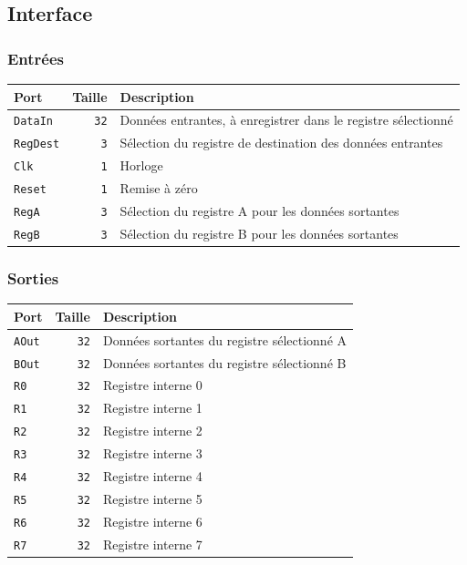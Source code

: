 \subsection{Interface}

\subsubsection{Entrées}

\begin{tabular}{|l|r|l|}
\hline
\textbf{Port}		& \textbf{Taille} & \textbf{Description}\\
\hline

\texttt{DataIn}		& \texttt{32} & Données entrantes, à enregistrer dans le registre sélectionné\\
\hline
\texttt{RegDest}	&  \texttt{3} & Sélection du registre de destination des données entrantes\\
\hline
\texttt{Clk}		&  \texttt{1} & Horloge\\
\hline
\texttt{Reset}		&  \texttt{1} & Remise à zéro\\
\hline
\texttt{RegA}		&  \texttt{3} & Sélection du registre A pour les données sortantes\\
\hline
\texttt{RegB}		&  \texttt{3} & Sélection du registre B pour les données sortantes\\

\hline
\end{tabular}


\subsubsection{Sorties}

\begin{tabular}{|l|r|l|}
\hline 
\textbf{Port} & \textbf{Taille} & \textbf{Description}\\
\hline

\texttt{AOut}	& \texttt{32} & Données sortantes du registre sélectionné A\\
\hline
\texttt{BOut}	& \texttt{32} & Données sortantes du registre sélectionné B\\
\hline
\texttt{R0}	& \texttt{32} & Registre interne 0\\
\hline
\texttt{R1}	& \texttt{32} & Registre interne 1\\
\hline
\texttt{R2}	& \texttt{32} & Registre interne 2\\
\hline
\texttt{R3}	& \texttt{32} & Registre interne 3\\
\hline
\texttt{R4}	& \texttt{32} & Registre interne 4\\
\hline
\texttt{R5}	& \texttt{32} & Registre interne 5\\
\hline
\texttt{R6}	& \texttt{32} & Registre interne 6\\
\hline
\texttt{R7}	& \texttt{32} & Registre interne 7\\

\hline
\end{tabular}

